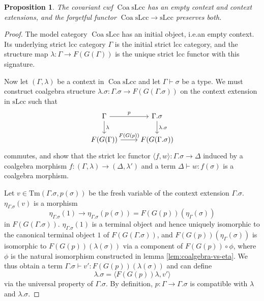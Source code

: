 \documentclass[a4paper]{article}
\newtheorem{proposition}[theorem]{Proposition}
\theoremstyle{remark}
\theoremstyle{definition}
\begin{document}
\begin{proposition}
  \label{prop:coa-slcc-exts}
  The covariant cwf $\operatorname{Coa} \mathrm{sLcc}$ has an empty context and context extensions, and the forgetful functor $\operatorname{Coa} \mathrm{sLcc} \rightarrow \mathrm{sLcc}$ preserves both.
\end{proposition}
\begin{proof}
  The model category $\operatorname{Coa} \mathrm{sLcc}$ has an initial object, i.e.\@ an empty context.
  Its underlying strict lcc category $\Gamma$ is the initial strict lcc category, and the structure map $\lambda : \Gamma \rightarrow F(G(\Gamma))$ is the unique strict lcc functor with this signature.

  Now let $(\Gamma, \lambda)$ be a context in $\operatorname{Coa} \mathrm{sLcc}$ and let $\Gamma \vdash \sigma$ be a type.
  We must construct coalgebra structure $\lambda.\sigma : \Gamma.\sigma \rightarrow F(G(\Gamma.\sigma))$ on the context extension in $\mathrm{sLcc}$ such that
  \begin{equation}
    \begin{tikzcd}
      \Gamma \arrow[r, "p"] \arrow[d, "\lambda"] & \Gamma.\sigma \arrow[d, "\lambda.\sigma"] \\
      F(G(\Gamma)) \arrow[r, "F(G(p))"] & F(G(\Gamma.\sigma))
    \end{tikzcd}
  \end{equation}
  commutes, and show that the strict lcc functor $\langle f, w \rangle : \Gamma.\sigma \rightarrow \Delta$ induced by a coalgebra morphism $f : (\Gamma, \lambda) \rightarrow (\Delta, \lambda')$ and a term $\Delta \vdash w : f(\sigma)$ is a coalgebra morphism.

  Let $v \in \mathrm{Tm}(\Gamma.\sigma, p(\sigma))$ be the fresh variable of the context extension $\Gamma.\sigma$.
  $\eta_{\Gamma.\sigma}(v)$ is a morphism
  \begin{equation}
    \eta_{\Gamma.\sigma}(1) \rightarrow \eta_{\Gamma.\sigma}(p(\sigma)) = F(G(p))(\eta_\Gamma(\sigma))
  \end{equation}
  in $F(G(\Gamma.\sigma))$.
  $\eta_{\Gamma.\sigma}(1)$ is a terminal object and hence uniquely isomorphic to the canonical terminal object $1$ of $F(G(\Gamma.\sigma))$, and $F(G(p))(\eta_\Gamma(\sigma))$ is isomorphic to $F(G(p))(\lambda(\sigma))$ via a component of $F(G(p)) \circ \phi$, where $\phi$ is the natural isomorphism constructed in lemma \ref{lem:coalgebra-vs-eta}.
  We thus obtain a term $\Gamma.\sigma \vdash v' : F(G(p))(\lambda(\sigma))$ and can define
  \begin{equation}
    \lambda.\sigma = \langle F(G(p)) \lambda, v' \rangle
  \end{equation}
  via the universal property of $\Gamma.\sigma$.
  By definition, $p : \Gamma \rightarrow \Gamma.\sigma$ is compatible with $\lambda$ and $\lambda.\sigma$.


\end{proof}
\end{document}
